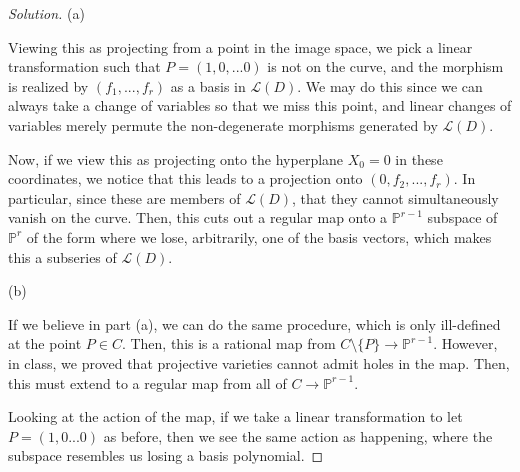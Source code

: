 \documentclass[10pt]{article}
\begin{document}
\begin{proof}[Solution]

(a)

Viewing this as projecting from a point in the image space, we pick a linear transformation such that $P = (1,0,...0)$ is not on the curve, and the morphism is realized by $(f_1,...,f_r)$ as a basis in $\mathcal{L}(D)$. We may do this since we can always take a change of variables so that we miss this point, and linear changes of variables merely permute the non-degenerate morphisms generated by $\mathcal{L}(D)$.

Now, if we view this as projecting onto the hyperplane $X_0 = 0$ in these coordinates, we notice that this leads to a projection onto $(0,f_2,...,f_r)$. In particular, since these are members of $\mathcal{L}(D)$, that they cannot simultaneously vanish on the curve. Then, this cuts out a regular map onto a $\mathbb{P}^{r-1}$ subspace of $\mathbb{P}^r$ of the form where we lose, arbitrarily, one of the basis vectors, which makes this a subseries of $\mathcal{L}(D)$.


(b)

If we believe in part (a), we can do the same procedure, which is only ill-defined at the point $P \in C$. Then, this is a rational map from $C \setminus \{ P \} \to \mathbb{P}^{r-1}$. However, in class, we proved that projective varieties cannot admit holes in the map. Then, this must extend to a regular map from all of $C \to \mathbb{P}^{r-1}$.

Looking at the action of the map, if we take a linear transformation to let $P = (1,0...0)$ as before, then we see the same action as happening, where the subspace resembles us losing a basis polynomial. 

\end{proof}
\end{document}
